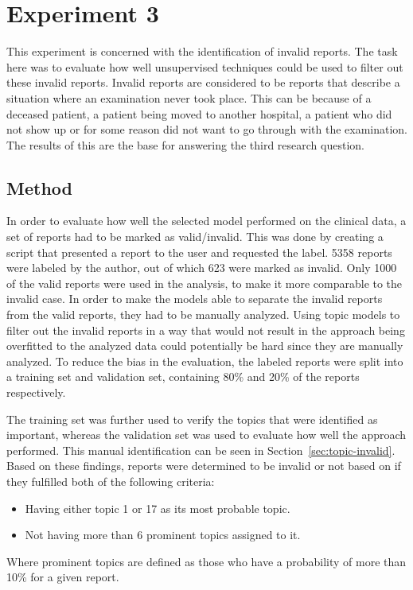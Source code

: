 \section{Experiment 3}
\label{sec:experiments-exp3}
This experiment is concerned with the identification of invalid reports.
The task here was to evaluate how well unsupervised techniques could be used to filter out these invalid reports.
Invalid reports are considered to be reports that describe a situation where an examination never took place.
This can be because of a deceased patient, a patient being moved to another hospital, a patient who did not show up or for some reason did not want to go through with the examination.
The results of this are the base for answering the third research question.

\subsection{Method}
\label{sec:exp3-method}

In order to evaluate how well the selected model performed on the clinical data, a set of reports had to be marked as valid/invalid.
This was done by creating a script that presented a report to the user and requested the label.
5358 reports were labeled by the author, out of which 623 were marked as invalid. 
Only 1000 of the valid reports were used in the analysis, to make it more comparable to the invalid case.
In order to make the models able to separate the invalid reports from the valid reports, they had to be manually analyzed.
Using topic models to filter out the invalid reports in a way that would not result in the approach being overfitted to the analyzed data could potentially be hard since they are manually analyzed. 
To reduce the bias in the evaluation, the labeled reports were split into a training set and validation set, containing 80\% and 20\% of the reports respectively.

The training set was further used to verify the topics that were identified as important, whereas the validation set was used to evaluate how well the approach performed.
This manual identification can be seen in Section~\ref{sec:topic-invalid}.
Based on these findings, reports were determined to be invalid or not based on if they fulfilled both of the following criteria:
\begin{itemize}
    \item Having either topic 1 or 17 as its most probable topic.
    \item Not having more than 6 prominent topics assigned to it.
\end{itemize}
Where prominent topics are defined as those who have a probability of more than 10\% for a given report.


